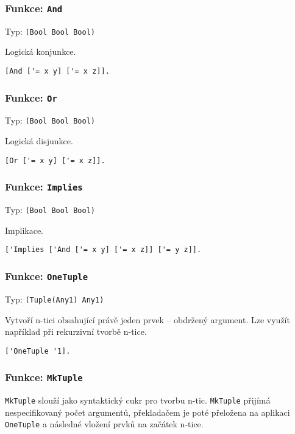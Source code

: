 \subsubsection*{Funkce: \lstinline{And}}
Typ: \lstinline{(Bool Bool Bool)}

Logická konjunkce.

\begin{lstlisting}[caption={Ukázka využití And}]
[And ['= x y] ['= x z]].
\end{lstlisting}

\subsubsection*{Funkce: \lstinline{Or}}
Typ: \lstinline{(Bool Bool Bool)}

Logická disjunkce.

\begin{lstlisting}[caption={Ukázka využití Or}]
[Or ['= x y] ['= x z]].
\end{lstlisting}

\subsubsection*{Funkce: \lstinline{Implies}}
Typ: \lstinline{(Bool Bool Bool)}

Implikace.

\begin{lstlisting}[caption={Ukázka využití Implies}]
['Implies ['And ['= x y] ['= x z]] ['= y z]].
\end{lstlisting}

\subsubsection*{Funkce: \lstinline{OneTuple}}
Typ: \lstinline{(Tuple(Any1) Any1)}

Vytvoří n-tici obsahující právě jeden prvek -- obdržený argument. Lze využít například při rekurzivní
tvorbě n-tice.

\begin{lstlisting}[caption={Ukázka využití OneTuple}]
['OneTuple '1].
\end{lstlisting}

\subsubsection*{Funkce: \lstinline{MkTuple}}\label{mk-tuple-fn}

\lstinline{MkTuple} slouží jako syntaktický cukr pro tvorbu n-tic. \lstinline{MkTuple} přijímá
nespecifikovaný počet argumentů, překladačem je poté přeložena na aplikaci \lstinline{OneTuple}
a následné vložení prvků na začátek n-tice.

